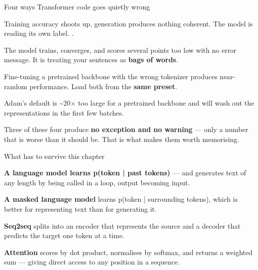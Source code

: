 \documentclass[aspectratio=169,11pt,t]{beamer}
\begin{document}
\begin{frame}[shrink=25]{Four ways Transformer code goes quietly wrong}
\begin{minipage}[t]{0.494\textwidth}
\begin{icardbad}
Training accuracy shoots up, generation produces nothing coherent. The model is reading its own label. .
\end{icardbad}
\end{minipage}%
\hfill
\begin{minipage}[t]{0.494\textwidth}
\begin{icardbad}
The model trains, converges, and scores several points too low with no error message. It is treating your sentences as \textbf{bags of words}.
\end{icardbad}
\end{minipage}%


\vskip 4pt

\begin{minipage}[t]{0.494\textwidth}
\begin{icardwarn}
Fine-tuning a pretrained backbone with the wrong tokenizer produces near-random performance. Load both from the \textbf{same preset}.
\end{icardwarn}
\end{minipage}%
\hfill
\begin{minipage}[t]{0.494\textwidth}
\begin{icardwarn}
Adam's default is \textasciitilde{}20$\times$ too large for a pretrained backbone and will wash out the representations in the first few batches.
\end{icardwarn}
\end{minipage}%
{\fontsize{9.4}{12.6}\selectfont\color{fg2}Three of these four produce \textbf{no exception and no warning} --- only a number that is worse than it should be. That is what makes them worth memorising.\par}\vskip 4pt
\end{frame}

\begin{frame}[shrink=25]{What has to survive this chapter}
\begin{isteps}
\item \textbf{A language model learns p(token | past tokens)} --- and generates text of any length by being called in a loop, output becoming input.
\item \textbf{A masked language model} learns p(token | surrounding tokens), which is better for representing text than for generating it.
\item \textbf{Seq2seq} splits into an encoder that represents the source and a decoder that predicts the target one token at a time.
\item \textbf{Attention} scores by dot product, normalises by softmax, and returns a weighted sum --- giving direct access to any position in a sequence.
\end{isteps}
\end{frame}
\end{document}
